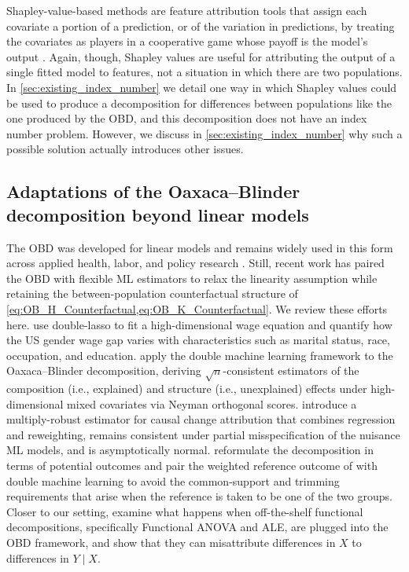 Shapley-value-based methods are feature attribution tools that assign each covariate a portion of a prediction, or of the variation in predictions, by treating the covariates as players in a cooperative game whose payoff is the model's output \citep{Shapley1953, Lundberg2017, chen2025shapley}.
Again, though, Shapley values are useful for attributing the output of a single fitted model to features, not a situation in which there are two populations.
In \cref{sec:existing_index_number} we detail one way in which Shapley values could be used to produce a decomposition for differences between populations like the one produced by the OBD, and this decomposition does not have an index number problem. However, we discuss in \cref{sec:existing_index_number} why such a possible solution actually introduces other issues.

\subsection{Adaptations of the Oaxaca--Blinder decomposition beyond linear models}
\label{appendix:obd_generalized}

The OBD was developed for linear models \citep{oaxaca1973, blinder1973} and remains widely used in this form across applied health, labor, and policy research \citep{paradaContzen2025, barhaim2023, cartwright2021}.
Still, recent work has paired the OBD with flexible ML estimators to relax the linearity assumption while retaining the between-population counterfactual structure of \cref{eq:OB_H_Counterfactual,eq:OB_K_Counterfactual}.
We review these efforts here.
\citet{bach2024heterogeneity} use double-lasso to fit a high-dimensional wage equation and quantify how the US gender wage gap varies with characteristics such as marital status, race, occupation, and education.
\citet{mao2025double} apply the double machine learning framework to the Oaxaca--Blinder decomposition, deriving $\sqrt{n}$-consistent estimators of the composition (i.e., explained) and structure (i.e., unexplained) effects under high-dimensional mixed covariates via Neyman orthogonal scores.
\citet{quintas2024multiply} introduce a multiply-robust estimator for causal change attribution that combines regression and reweighting, remains consistent under partial misspecification of the nuisance ML models, and is asymptotically normal.
\citet{flachaire2025decomposing} reformulate the decomposition in terms of potential outcomes and pair the weighted reference outcome of \citet{neumark1988} with double machine learning to avoid the common-support and trimming requirements that arise when the reference is taken to be one of the two groups.
Closer to our setting, \citet{quintero2025} examine what happens when off-the-shelf functional decompositions, specifically Functional ANOVA and ALE, are plugged into the OBD framework, and show that they can misattribute differences in $X$ to differences in $Y \mid X$.

